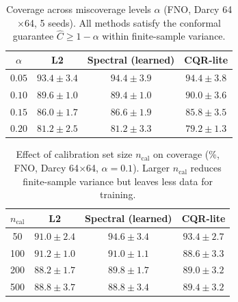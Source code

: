 \begin{table}[t]
\centering
\caption{Coverage across miscoverage levels $\alpha$ (FNO, Darcy 64$\times$64, 5 seeds).
All methods satisfy the conformal guarantee $\hat{C} \geq 1-\alpha$ within finite-sample variance.}
\label{tab:alpha}
\small
\begin{tabular}{cccc}
\toprule
$\alpha$ & \textbf{L2} & \textbf{Spectral (learned)} & \textbf{CQR-lite} \\
\midrule
$0.05$ & $93.4 \pm 3.4$ & $94.4 \pm 3.9$ & $94.4 \pm 3.8$ \\
$0.10$ & $89.6 \pm 1.0$ & $89.4 \pm 1.0$ & $90.0 \pm 3.6$ \\
$0.15$ & $86.0 \pm 1.7$ & $86.6 \pm 1.9$ & $85.8 \pm 3.5$ \\
$0.20$ & $81.2 \pm 2.5$ & $81.2 \pm 3.3$ & $79.2 \pm 1.3$ \\
\bottomrule
\end{tabular}
\end{table}


\begin{table}[t]
\centering
\caption{Effect of calibration set size $n_\text{cal}$ on coverage (\%, FNO, Darcy 64$\times$64, $\alpha=0.1$).
Larger $n_\text{cal}$ reduces finite-sample variance but leaves less data for training.}
\label{tab:ncal}
\small
\begin{tabular}{cccc}
\toprule
$n_\text{cal}$ & \textbf{L2} & \textbf{Spectral (learned)} & \textbf{CQR-lite} \\
\midrule
  50 & $91.0 \pm 2.4$ & $94.6 \pm 3.4$ & $93.4 \pm 2.7$ \\
  100 & $91.2 \pm 1.0$ & $91.0 \pm 1.1$ & $88.6 \pm 3.3$ \\
  200 & $88.2 \pm 1.7$ & $89.8 \pm 1.7$ & $89.0 \pm 3.2$ \\
  500 & $88.8 \pm 3.7$ & $88.8 \pm 3.4$ & $89.4 \pm 3.2$ \\
\bottomrule
\end{tabular}
\end{table}


